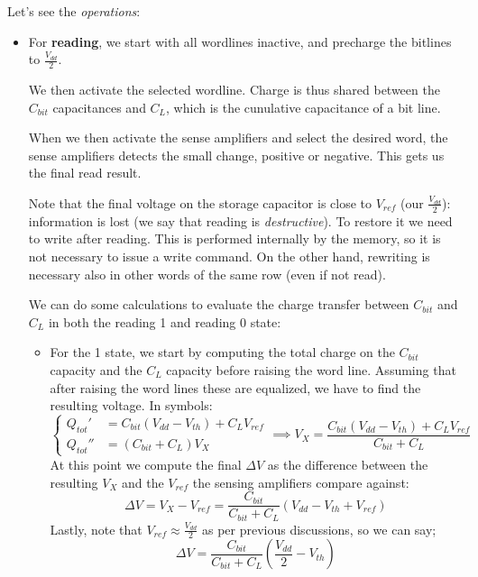 \documentclass[a4paper,11pt]{article}
\begin{document}
Let's see the \textit{operations}:
\begin{itemize}
	\item For \textbf{reading}, we start with all wordlines inactive, and precharge the bitlines to $\frac{V_{dd}}{2}$.

	      We then activate the selected wordline.
	      Charge is thus shared between the $C_{bit}$ capacitances and $C_L$, which is the cunulative capacitance of a bit line.

	      When we then activate the sense amplifiers and select the desired word, the sense amplifiers detects the small change, positive or negative. This gets us the final read result.

	      Note that the final voltage on the storage capacitor is close to $V_{ref}$ (our $\frac{V_{dd}}{2}$): information is lost (we say that reading is \textit{destructive}).
	      To restore it we need to write after reading.
	      This is performed internally by the memory, so it is not necessary to issue a write command.
	      On the other hand, rewriting is necessary also in other words of the same row (even if not read).

	      We can do some calculations to evaluate the charge transfer between $C_{bit}$ and $C_L$ in both the reading 1 and reading 0 state:
	      \begin{itemize}
		      \item For the 1 state, we start by computing the total charge on the $C_{bit}$ capacity and the $C_L$ capacity before raising the word line. Assuming that after raising the word lines these are equalized, we have to find the resulting voltage. In symbols:
		            $$
			            \begin{cases}
				            Q_{tot}'  & = C_{bit} (V_{dd} - V_{th}) + C_L V_{ref} \\
				            Q_{tot}'' & = (C_{bit} + C_L) V_X
			            \end{cases}
			            \implies
			            V_X = \frac{C_{bit} (V_{dd} - V_{th}) + C_L V_{ref}}{C_{bit} + C_L}
		            $$
		            At this point we compute the final $\Delta V$ as the difference between the resulting $V_X$ and the $V_{ref}$ the sensing amplifiers compare against:
		            $$
			            \Delta V = V_X - V_{ref} = \frac{C_{bit}}{C_{bit} + C_L} \left( V_{dd} - V_{th} + V_{ref} \right)
		            $$
		            Lastly, note that $V_{ref} \approx \frac{V_{dd}}{2}$ as per previous discussions, so we can say;
		            $$
			            \Delta V = \frac{C_{bit}}{C_{bit} + C_L} \left( \frac{V_{dd}}{2} - V_{th} \right)
		            $$


\end{itemize}
\end{itemize}
\end{document}

